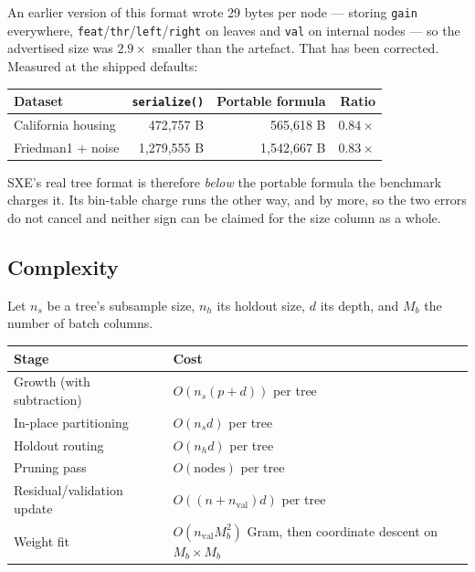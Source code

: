 \documentclass[11pt,a4paper]{article}
\newcommand{\code}[1]{\texttt{\small #1}}
\newcommand{\SXE}{\textsc{SXE}}
\theoremstyle{definition}
\begin{document}
An earlier version of this format wrote 29 bytes per node --- storing
\code{gain} everywhere, \code{feat}/\code{thr}/\code{left}/\code{right} on
leaves and \code{val} on internal nodes --- so the advertised size was
$2.9\times$ smaller than the artefact. That has been corrected. Measured at the
shipped defaults:

\begin{center}
\begin{tabular}{lrrr}
\toprule
Dataset & \code{serialize()} & Portable formula & Ratio \\
\midrule
California housing & 472{,}757 B & 565{,}618 B & $0.84\times$ \\
Friedman1 + noise & 1{,}279{,}555 B & 1{,}542{,}667 B & $0.83\times$ \\
\bottomrule
\end{tabular}
\end{center}

\noindent \SXE's real tree format is therefore \emph{below} the portable
formula the benchmark charges it. Its bin-table charge runs the other way, and
by more, so the two errors do not cancel and neither sign can be claimed for the
size column as a whole.

\subsection{Complexity}\label{sec:complexity}

Let $n_s$ be a tree's subsample size, $n_h$ its holdout size, $d$ its depth,
and $M_b$ the number of batch columns.

\begin{center}
\begin{tabular}{ll}
\toprule
Stage & Cost \\
\midrule
Growth (with subtraction) & $O(n_s (p + d))$ per tree \\
In-place partitioning & $O(n_s d)$ per tree \\
Holdout routing & $O(n_h d)$ per tree \\
Pruning pass & $O(\text{nodes})$ per tree \\
Residual/validation update & $O((n + n_{\text{val}}) d)$ per tree \\
Weight fit & $O(n_{\text{val}} M_b^2)$ Gram, then coordinate descent on $M_b \times M_b$ \\
\bottomrule
\end{tabular}
\end{center}
\end{document}
